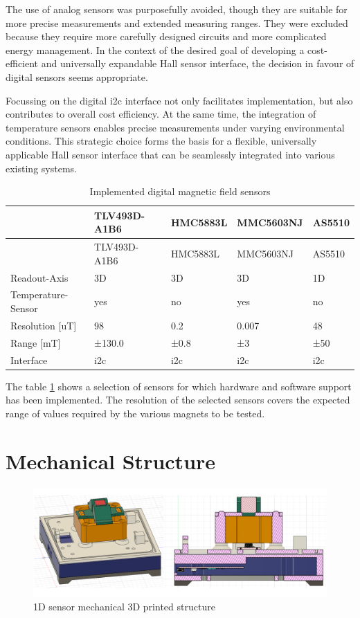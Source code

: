 The use of analog sensors was purposefully avoided, though they are
suitable for more precise measurements and extended measuring ranges.
They were excluded because they require more carefully designed circuits
and more complicated energy management. In the context of the desired
goal of developing a cost-efficient and universally expandable Hall
sensor interface, the decision in favour of digital sensors seems
appropriate.

Focussing on the digital \gls{i2c} interface not only facilitates
implementation, but also contributes to overall cost efficiency. At the
same time, the integration of temperature sensors enables precise
measurements under varying environmental conditions. This strategic
choice forms the basis for a flexible, universally applicable Hall
sensor interface that can be seamlessly integrated into various existing
systems.

\begin{longtable}[]{@{}lllll@{}}
\caption{Implemented digital magnetic field sensors
\label{Implemented_digital_magnetic_field_sensors.csv}}\tabularnewline
\toprule
& TLV493D-A1B6 & HMC5883L & MMC5603NJ & AS5510\tabularnewline
\midrule
\endfirsthead
\toprule
& TLV493D-A1B6 & HMC5883L & MMC5603NJ & AS5510\tabularnewline
\midrule
\endhead
Readout-Axis & 3D & 3D & 3D & 1D\tabularnewline
Temperature-Sensor & yes & no & yes & no\tabularnewline
Resolution {[}uT{]} & 98 & 0.2 & 0.007 & 48\tabularnewline
Range {[}mT{]} & ±130.0 & ±0.8 & ±3 & ±50\tabularnewline
Interface & \gls{i2c} & \gls{i2c} & \gls{i2c} & \gls{i2c}\tabularnewline
\bottomrule
\end{longtable}

The table \ref{Implemented_digital_magnetic_field_sensors.csv} shows a
selection of sensors for which hardware and software support has been
implemented. The resolution of the selected sensors covers the expected
range of values required by the various magnets to be tested.

\hypertarget{mechanical-structure}{%
\section{Mechanical Structure}\label{mechanical-structure}}

\begin{figure}
\centering
\includegraphics{./generated_images/border_1D_sensor_mechanical_3D_printed_structure.png}
\caption{1D sensor mechanical 3D printed structure
\label{1D_sensor_mechanical_3D_printed_structure.png}}
\end{figure}

